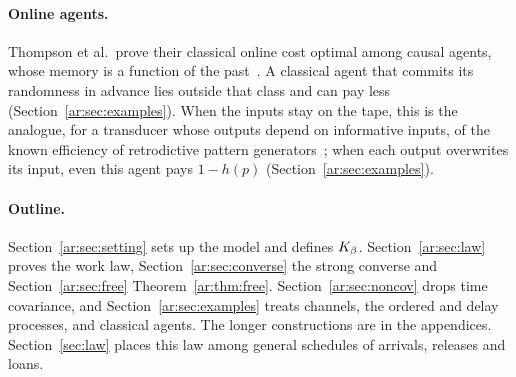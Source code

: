 \paragraph{Online agents.} Thompson et al.\ prove their classical online cost optimal among causal agents, whose memory is a function of the past~\cite{Thompson25}. A classical agent that commits its randomness in advance lies outside that class and can pay less (Section~\ref{ar:sec:examples}). When the inputs stay on the tape, this is the analogue, for a transducer whose outputs depend on informative inputs, of the known efficiency of retrodictive pattern generators~\cite{BMRC17,BMC18,LoomisCrutchfield20}; when each output overwrites its input, even this agent pays $1-h(p)$ (Section~\ref{ar:sec:examples}).

\paragraph{Outline.} Section~\ref{ar:sec:setting} sets up the model and defines $K_\beta$. Section~\ref{ar:sec:law} proves the work law, Section~\ref{ar:sec:converse} the strong converse and Section~\ref{ar:sec:free} Theorem~\ref{ar:thm:free}. Section~\ref{ar:sec:noncov} drops time covariance, and Section~\ref{ar:sec:examples} treats channels, the ordered and delay processes, and classical agents. The longer constructions are in the appendices. Section~\ref{sec:law} places this law among general schedules of arrivals, releases and loans.

